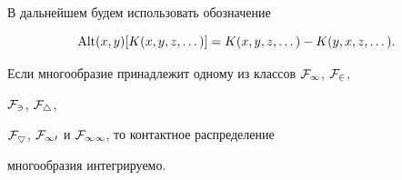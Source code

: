  


В дальнейшем будем использовать обозначение 


$$ 


\Alt(x,y)[K(x,y,z,\dotsc)]=K(x,y,z,\dotsc)- 


K(y,x,z,\dotsc). 


$$ 


 


\begin{thm} 


Если многообразие принадлежит одному из классов $\cal F_1$, $\cal F_2$, 


$\cal F_3$, $\cal F_4$, 


$\cal F_5$, $\cal F_{10}$ и $\cal F_{11}$, то контактное распределение 


многообразия интегрируемо. 


\end{thm} 


 


